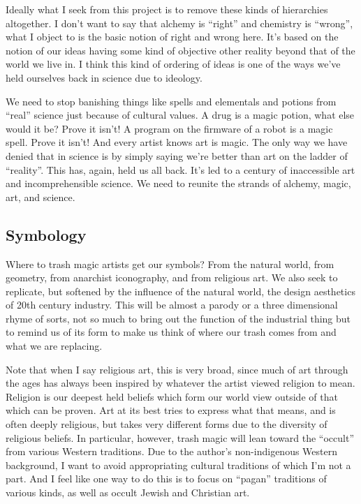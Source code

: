 Ideally what I seek from this project is to remove these kinds of
hierarchies altogether. I don't want to say that alchemy is ``right''
and chemistry is ``wrong'', what I object to is the basic notion of
right and wrong here. It's based on the notion of our ideas having some
kind of objective other reality beyond that of the world we live in. I
think this kind of ordering of ideas is one of the ways we've held
ourselves back in science due to ideology.

We need to stop banishing things like spells and elementals and potions
from ``real'' science just because of cultural values. A drug is a magic
potion, what else would it be? Prove it isn't! A program on the firmware
of a robot is a magic spell. Prove it isn't! And every artist knows art
is magic. The only way we have denied that in science is by simply
saying we're better than art on the ladder of ``reality''. This has,
again, held us all back. It's led to a century of inaccessible art and
incomprehensible science. We need to reunite the strands of alchemy,
magic, art, and science.

\subsection{Symbology}\label{symbology}

Where to trash magic artists get our symbols? From the natural world,
from geometry, from anarchist iconography, and from religious art. We
also seek to replicate, but softened by the influence of the natural
world, the design aesthetics of 20th century industry. This will be
almost a parody or a three dimensional rhyme of sorts, not so much to
bring out the function of the industrial thing but to remind us of its
form to make us think of where our trash comes from and what we are
replacing.

Note that when I say religious art, this is very broad, since much of
art through the ages has always been inspired by whatever the artist
viewed religion to mean. Religion is our deepest held beliefs which form
our world view outside of that which can be proven. Art at its best
tries to express what that means, and is often deeply religious, but
takes very different forms due to the diversity of religious beliefs. In
particular, however, trash magic will lean toward the ``occult'' from
various Western traditions. Due to the author's non-indigenous Western
background, I want to avoid appropriating cultural traditions of which
I'm not a part. And I feel like one way to do this is to focus on
``pagan'' traditions of various kinds, as well as occult Jewish and
Christian art.

